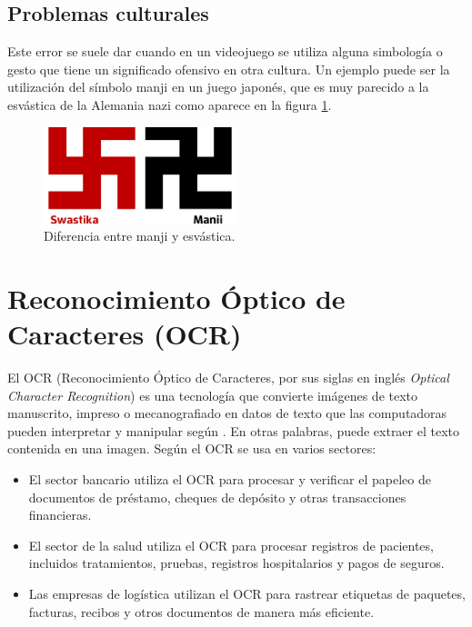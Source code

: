 \subsection{Problemas culturales}\label{ErrorCultura}
Este error se suele dar cuando en un videojuego se utiliza alguna simbología
o gesto que tiene un significado ofensivo en otra cultura. Un ejemplo puede ser la
utilización del símbolo manji en un juego japonés, que es muy parecido a la esvástica
de la Alemania nazi como aparece en la figura \ref{fig:ManjiEsvastica}.
\begin{figure}[H]
	\centering
	\includegraphics[width = 0.5\textwidth]{Imagenes/Errores_Localizacion/manji-swastika.png}
	\caption{Diferencia entre manji y esvástica.}
	\label{fig:ManjiEsvastica}
\end{figure}


\section{Reconocimiento Óptico de Caracteres (OCR)}
El OCR (Reconocimiento Óptico de Caracteres, por sus siglas en inglés \textit{Optical Character Recognition}) es una tecnología que convierte imágenes de texto manuscrito, impreso o mecanografiado en datos de texto que las computadoras pueden interpretar y manipular según \cite{WhatIsOCR}. En otras palabras, puede extraer el texto contenida en una imagen. Según \cite{WhatIsOCR} el OCR se usa en varios sectores:
\begin{itemize}
	\item El sector bancario utiliza el OCR para procesar y verificar el papeleo de documentos de préstamo, cheques de depósito y otras transacciones financieras.
	\item El sector de la salud utiliza el OCR para procesar registros de pacientes, incluidos tratamientos, pruebas, registros hospitalarios y pagos de seguros.
	\item Las empresas de logística utilizan el OCR para rastrear etiquetas de paquetes, facturas, recibos y otros documentos de manera más eficiente. 
\end{itemize}


